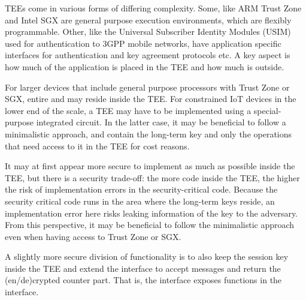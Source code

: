TEEs come in various forms of differing complexity.
%
Some, like ARM Trust Zone and Intel SGX are general purpose execution
environments, which are flexibly programmable.
%
Other, like the Universal Subscriber Identity Modules (USIM) used for
authentication to 3GPP mobile networks, have application specific interfaces 
for
authentication and key agreement protocols etc.
%
A key aspect is how much of the application is placed in the TEE and how 
much is
outside.
%

For larger devices that include general purpose processors with Trust Zone or
SGX, entire \mEdhoc{} and \mOscore{} may reside inside the TEE.
%
For constrained IoT devices in the lower end of the scale, a TEE may have to be
implemented using a special-purpose integrated circuit.
%
In the latter case, it may be beneficial to follow a minimalistic approach, and
contain the long-term key and only
the operations that need access to it in the TEE for cost reasons.
%

It may at first appear more secure to implement as much as possible inside the
TEE, but there is a security trade-off: the more code inside the TEE,
the higher the risk of implementation errors in the security-critical code.
%
Because the security critical code runs in the area where the long-term keys
reside, an implementation error here risks leaking information of the key to 
the
adversary.
%
From this perspective, it may be beneficial to follow the minimalistic approach
even when having access to Trust Zone or SGX.
%

A slightly more secure division of functionality is to also keep the
session key inside
the TEE and extend the interface to accept messages and return the
(en/de)crypted counter part.
%
That is, the interface exposes \mAead{} functions in the interface.
%

